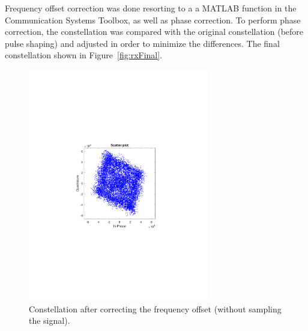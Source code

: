 \begin{refsection}
Frequency offset correction was done resorting to a a MATLAB function in the Communication Systems Toolbox, as well as phase correction. To perform phase correction, the constellation was compared with the original constellation (before pulse shaping) and adjusted in order to minimize the differences. The final constellation shown in Figure~\ref{fig:rxFinal}.

\begin{figure}[H]
	\centering
	\includegraphics[clip, trim=4cm 8cm 4cm 8cm, width=0.7\textwidth]{./sdf/m_qam_system/figures/exp/const-wvCorr.pdf}
	\caption{Constellation after correcting the frequency offset (without sampling the signal).}
	\label{fig:rxWvCorr}
\end{figure}


\end{refsection}
